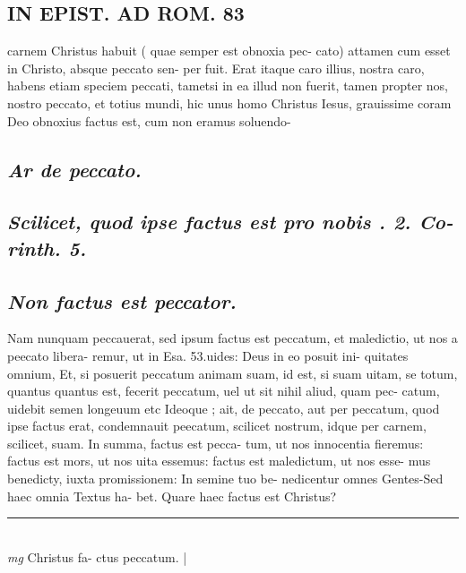 \documentclass{article}
\begin{document}
\begin{pages}
\section*{IN EPIST. AD ROM.  83 }
\marginpar{[ p.]}\pstart carnem Christus habuit ( quae semper est obnoxia pec- cato) attamen cum esset in Christo, absque peccato sen- per fuit. Erat itaque caro illius, nostra caro, habens etiam speciem peccati, tametsi in ea illud non fuerit, tamen propter nos, nostro peccato, et totius mundi, hic unus homo Christus Iesus, grauissime coram Deo obnoxius factus est, cum non eramus soluendo-  \pend
{}
{}
\subsection*{\textit{Ar de peccato. }}
{}
\subsection*{\textit{Scilicet, quod ipse factus est pro nobis . 2. Co- rinth. 5.  }}
{}
\subsection*{\textit{Non factus est peccator. }}\pstart Nam nunquam peccauerat, sed ipsum factus est peccatum, et maledictio, ut nos a peecato libera- remur, ut in Esa. 53.uides: Deus in eo posuit ini- quitates omnium, Et, si posuerit peccatum animam suam, id est, si suam uitam, se totum, quantus quantus est, fecerit peccatum, uel ut sit nihil aliud, quam pec- catum, uidebit semen longeuum etc Ideoque ; ait, de peccato, aut per peccatum, quod ipse factus erat, condemnauit peecatum, scilicet nostrum, idque per carnem, scilicet, suam. In summa, factus est pecca- tum, ut nos innocentia fieremus: factus est mors, ut nos uita essemus: factus est maledictum, ut nos esse- mus benedicty, iuxta promissionem: In semine tuo be- nedicentur omnes Gentes-Sed haec omnia Textus ha- bet. Quare haec factus est Christus?  \pend\pstart  \pend
\vspace{0.5cm}\noindent
\vspace{0.2cm}\rule{1cm}{0.2pt}\\ 
\hspace{0.2cm}\textit{mg}
\footnotesize Christus fa- ctus peccatum. 
\normalsize| 

\end{pages}
\end{document}

